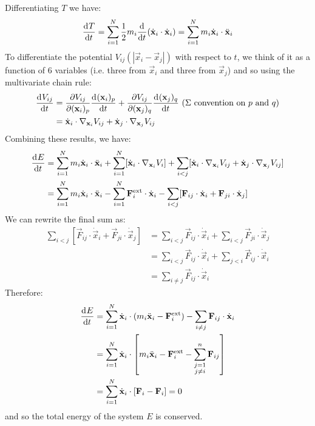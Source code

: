 \documentclass[../main.tex]{subfiles}
\begin{document}
Differentiating $T$ we have:
\[
  \deriv{T}{t} = \sum_{i = 1}^{N} \frac{1}{2} m_i \deriv{}{t}(\dot{\vec{x}}_i \cdot \dot{\vec{x}}_i) = \sum_{i = 1}^{N} m_i \dot{\vec{x}}_i \cdot \ddot{\vec{x}}_i
\]
To differentiate the potential $V_{i j}(|\vec{x}_i - \vec{x}_j|)$ with respect to $t$, we think of it as a function of 6 variables (i.e. three from $\vec{x}_i$ and three from $\vec{x}_j$) and so using the multivariate chain rule:
\begin{align*}
  \deriv{V_{i j}}{t} &= \pderiv{V_{i j}}{(\vec{x}_i)_p}\deriv{(\vec{x}_i)_p}{t} + \pderiv{V_{i j}}{(\vec{x}_j)_q}\deriv{(\vec{x}_j)_q}{t} \text{ ($\Sigma$ convention on $p$ and $q$)}\\
                     &= \dot{\vec{x}}_i \cdot \nabla_{\vec{x}_i} V_{i j} + \dot{\vec{x}}_j \cdot \nabla_{\vec{x}_j} V_{i j}
\end{align*}
Combining these results, we have:
\begin{align*}
  \deriv{E}{t} &= \sum_{i = 1}^{N} m_i \dot{\vec{x}}_i \cdot \ddot{\vec{x}}_i + \sum_{i = 1}^{N} [\dot{\vec{x}}_i \cdot \nabla_{\vec{x}_i} V_i] + \sum_{i < j} [\dot{\vec{x}}_i \cdot \nabla_{\vec{x}_i}V_{i j} + \dot{\vec{x}}_j \cdot \nabla_{\vec{x}_j}V_{i j}] \\
               &= \sum_{i = 1}^{N}  m_i \dot{\vec{x}}_i \cdot \ddot{\vec{x}}_i - \sum_{i = 1}^{N} \vec{F}^{\text{ext}}_i \cdot \dot{\vec{x}}_i - \sum_{i < j} [\vec{F}_{i j} \cdot \dot{\vec{x}}_i + \vec{F}_{ji} \cdot \dot{\vec{x}}_j]
\end{align*}
We can rewrite the final sum as:
\begin{align*}
  \sum_{i < j} [\vec{F}_{i j} \cdot \dot{\vec{x}}_i + \vec{F}_{ji} \cdot \dot{\vec{x}}_j] &= \sum_{i < j} \vec{F}_{i j} \cdot \dot{\vec{x}}_i + \sum_{i < j} \vec{F}_{j i} \cdot \dot{\vec{x}}_j \\
                                                                                          &= \sum_{i < j} \vec{F}_{i j} \cdot \dot{\vec{x}}_i + \sum_{j < i} \vec{F}_{i j} \cdot \dot{\vec{x}}_i \\
                                                                                          &= \sum_{i \neq j} \vec{F}_{i j} \cdot \dot{\vec{x}}_i
\end{align*}
Therefore:
\begin{align*}
  \deriv{E}{t} &= \sum_{i = 1}^{N} \dot{\vec{x}}_i \cdot (m_i \ddot{\vec{x}}_i - \vec{F}^\text{ext}_i) - \sum_{i \neq j} \vec{F}_{i j} \cdot \dot{\vec{x}}_i \\
               &= \sum_{i = 1}^{N} \dot{\vec{x}}_i \cdot \left[m_i \ddot{\vec{x}}_i - \vec{F}^\text{ext}_i - \sum_{\substack{j = 1 \\ j \neq i}}^n \vec{F}_{i j}\right] \\
               &= \sum_{i = 1}^{N} \dot{\vec{x}}_i \cdot [\vec{F}_i - \vec{F}_i] = 0
\end{align*}
and so the total energy of the system $E$ is conserved.
\end{document}
